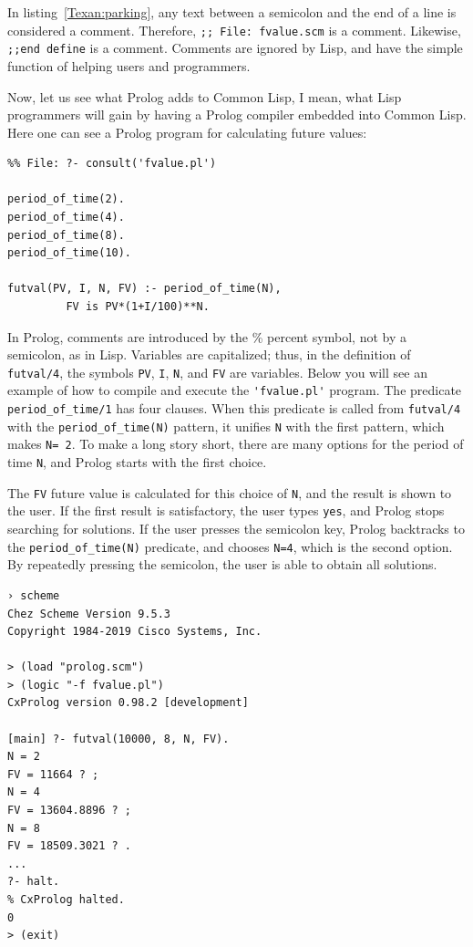 \documentclass[a4paper,12pt]{book}
\begin{document}
In listing~\ref{Texan:parking}, any text
between a semicolon and the end of
a line is considered a comment.
Therefore, \verb|;; File: fvalue.scm|
is a comment. Likewise, \verb|;;end define|
is a comment. Comments are ignored by
Lisp, and have the simple function of
helping users and programmers.

Now, let us see what Prolog adds to Common Lisp,
I mean, what Lisp programmers will gain by
having a Prolog compiler embedded into Common
Lisp. Here one can see a Prolog program for
calculating future values:
\begin{verbatim}
%% File: ?- consult('fvalue.pl')

period_of_time(2).
period_of_time(4).
period_of_time(8).
period_of_time(10).

futval(PV, I, N, FV) :- period_of_time(N),
		 FV is PV*(1+I/100)**N.
\end{verbatim}

In Prolog, comments are introduced by the \%
percent symbol, not by a semicolon, as in Lisp.
Variables are capitalized; thus, in the definition
of \verb|futval/4|, the symbols \verb|PV|, \verb|I|,
\verb|N|, and \verb|FV| are variables. Below you will
see an example of how to compile and execute
the \verb|'fvalue.pl'| program. The predicate
\verb|period_of_time/1| has four clauses. When
this predicate is called from \verb|futval/4| with the 
\verb|period_of_time(N)| pattern, it unifies \verb|N|
with the first pattern, which makes \verb|N= 2|.
To make a long story short, there are many
options for the period of time \verb|N|, and Prolog
starts with the first choice.

The \verb|FV| future value is calculated for this choice
of \verb|N|, and the result is shown to the user. If the
first result is satisfactory, the user types
\verb|yes|, and Prolog stops searching for
solutions. If the user presses the semicolon
key, Prolog backtracks to the \verb|period_of_time(N)|
predicate, and chooses \verb|N=4|, which is
the second option. By repeatedly pressing
the semicolon, the user is able to obtain all solutions.

\begin{verbatim}
› scheme
Chez Scheme Version 9.5.3
Copyright 1984-2019 Cisco Systems, Inc.

> (load "prolog.scm")
> (logic "-f fvalue.pl")
CxProlog version 0.98.2 [development]

[main] ?- futval(10000, 8, N, FV).
N = 2
FV = 11664 ? ;
N = 4
FV = 13604.8896 ? ;
N = 8
FV = 18509.3021 ? .
...
?- halt.
% CxProlog halted.
0
> (exit)
\end{verbatim}
\end{document}
